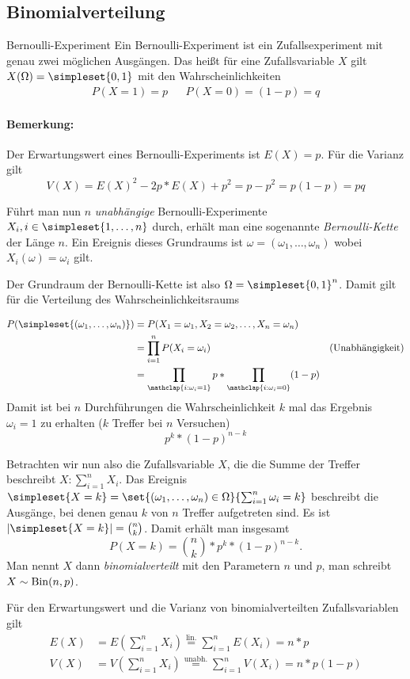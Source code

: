 \subsection{Binomialverteilung}
\begin{definition}{Bernoulli-Experiment}
	Ein Bernoulli-Experiment ist ein Zufallsexperiment mit genau zwei möglichen Ausgängen. Das heißt für eine Zufallsvariable $X$ gilt $X(\Omega)=\simpleset{0,1}$ mit den Wahrscheinlichkeiten
	\begin{align*}
		P(X=1)=p && P(X=0)=(1-p)=q
	\end{align*}
\end{definition}
\paragraph{Bemerkung:}
Der Erwartungswert eines Bernoulli-Experiments ist $E(X)=p$. Für die Varianz gilt 
\begin{equation*}
	V(X)=E(X)^2-2p*E(X)+p^2=p-p^2=p(1-p)=pq
\end{equation*}

Führt man nun $n$ \emph{unabhängige} Bernoulli-Experimente $X_i, i\in\simpleset{1,\ldots,n}$ durch, erhält man eine sogenannte \emph{Bernoulli-Kette} der Länge $n$. Ein Ereignis dieses Grundraums ist $\omega=(\omega_1,\ldots,\omega_n)$ wobei $X_i(\omega)=\omega_i$ gilt.

Der Grundraum der Bernoulli-Kette ist also $\Omega=\simpleset{0,1}^n$. Damit gilt für die Verteilung des Wahrscheinlichkeitsraums

\begin{align*}
	P(\simpleset{(\omega_1,\ldots,\omega_n)})&=P(X_1=\omega_1, X_2=\omega_2, \ldots, X_n=\omega_n)\\
	&=\prod_{i=1}^n P(X_i=\omega_i) &\text{(Unabhängigkeit)}\\
	&=\prod_{\mathclap{i:\omega_i=1}}p * \prod_{\mathclap{i:\omega_i=0}}(1-p)
\end{align*}
Damit ist bei $n$ Durchführungen die Wahrscheinlichkeit $k$ mal das Ergebnis $\omega_i=1$ zu erhalten ($k$ Treffer bei $n$ Versuchen) 
\begin{equation*}
	p^k*(1-p)^{n-k}
\end{equation*}

Betrachten wir nun also die Zufallsvariable $X$, die die Summe der Treffer beschreibt $X:\sum_{i=1}^n X_i$.
Das Ereignis $\simpleset{X=k}=\set{(\omega_1,\ldots,\omega_n)\in\Omega}{\sum_{i=1}^n \omega_i=k}$ beschreibt die Ausgänge, bei denen genau $k$ von $n$ Treffer aufgetreten sind. Es ist $|\simpleset{X=k}|=\binom nk$. Damit erhält man insgesamt
\begin{equation*}
	P(X=k)=\binom nk * p^k*(1-p)^{n-k}.
\end{equation*}
Man nennt $X$ dann \emph{binomialverteilt} mit den Parametern $n$ und $p$, man schreibt $X\sim \operatorname{Bin}(n,p)$.

Für den Erwartungswert und die Varianz von binomialverteilten Zufallsvariablen gilt
\begin{align*}
	E(X)&=E\left(\sum_{i=1}^n X_i\right)\overset{\text{lin.}}=\sum_{i=1}^n E(X_i)=n*p\\
	V(X)&=V\left(\sum_{i=1}^n X_i\right)\overset{\text{unabh.}}=\sum_{i=1}^n V(X_i)=n*p(1-p)
\end{align*}